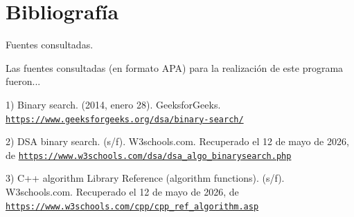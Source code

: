 \chapter{Bibliografía }
\hypertarget{_bibliograf_xC3_xADa}{}\label{_bibliograf_xC3_xADa}
Fuentes consultadas.

Las fuentes consultadas (en formato APA) para la realización de este programa fueron...

1) Binary search. (2014, enero 28). Geeksfor\+Geeks. \href{https://www.geeksforgeeks.org/dsa/binary-search/}{\texttt{https:\+/\+/\+www.\+geeksforgeeks.\+org/\+dsa/\+binary-\/search/\+}}

2) DSA binary search. (s/\+f). W3schools.\+com. Recuperado el 12 de mayo de 2026, de \href{https://www.w3schools.com/dsa/dsa_algo_binarysearch.php}{\texttt{https:\+/\+/\+www.\+w3schools.\+com/\+dsa/\+dsa\+\_\+algo\+\_\+binarysearch.\+php}}

3) C++ algorithm Library Reference (algorithm functions). (s/\+f). W3schools.\+com. Recuperado el 12 de mayo de 2026, de \href{https://www.w3schools.com/cpp/cpp_ref_algorithm.asp}{\texttt{https:\+/\+/\+www.\+w3schools.\+com/\+cpp/\+cpp\+\_\+ref\+\_\+algorithm.\+asp}} 